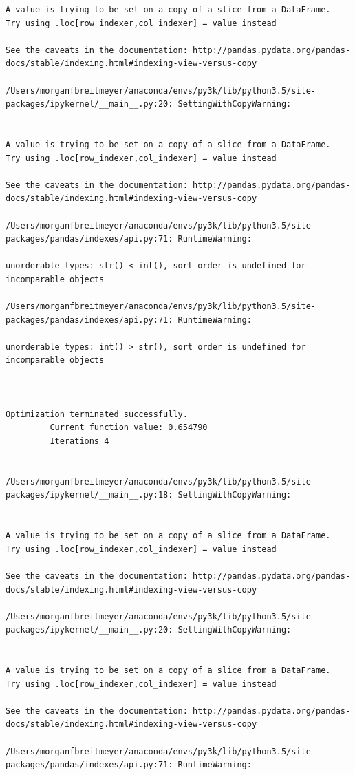 \begin{lstlisting}
A value is trying to be set on a copy of a slice from a DataFrame.
Try using .loc[row_indexer,col_indexer] = value instead

See the caveats in the documentation: http://pandas.pydata.org/pandas-docs/stable/indexing.html#indexing-view-versus-copy

/Users/morganfbreitmeyer/anaconda/envs/py3k/lib/python3.5/site-packages/ipykernel/__main__.py:20: SettingWithCopyWarning:


A value is trying to be set on a copy of a slice from a DataFrame.
Try using .loc[row_indexer,col_indexer] = value instead

See the caveats in the documentation: http://pandas.pydata.org/pandas-docs/stable/indexing.html#indexing-view-versus-copy

/Users/morganfbreitmeyer/anaconda/envs/py3k/lib/python3.5/site-packages/pandas/indexes/api.py:71: RuntimeWarning:

unorderable types: str() < int(), sort order is undefined for incomparable objects

/Users/morganfbreitmeyer/anaconda/envs/py3k/lib/python3.5/site-packages/pandas/indexes/api.py:71: RuntimeWarning:

unorderable types: int() > str(), sort order is undefined for incomparable objects



Optimization terminated successfully.
         Current function value: 0.654790
         Iterations 4


/Users/morganfbreitmeyer/anaconda/envs/py3k/lib/python3.5/site-packages/ipykernel/__main__.py:18: SettingWithCopyWarning:


A value is trying to be set on a copy of a slice from a DataFrame.
Try using .loc[row_indexer,col_indexer] = value instead

See the caveats in the documentation: http://pandas.pydata.org/pandas-docs/stable/indexing.html#indexing-view-versus-copy

/Users/morganfbreitmeyer/anaconda/envs/py3k/lib/python3.5/site-packages/ipykernel/__main__.py:20: SettingWithCopyWarning:


A value is trying to be set on a copy of a slice from a DataFrame.
Try using .loc[row_indexer,col_indexer] = value instead

See the caveats in the documentation: http://pandas.pydata.org/pandas-docs/stable/indexing.html#indexing-view-versus-copy

/Users/morganfbreitmeyer/anaconda/envs/py3k/lib/python3.5/site-packages/pandas/indexes/api.py:71: RuntimeWarning:


\end{lstlisting}
